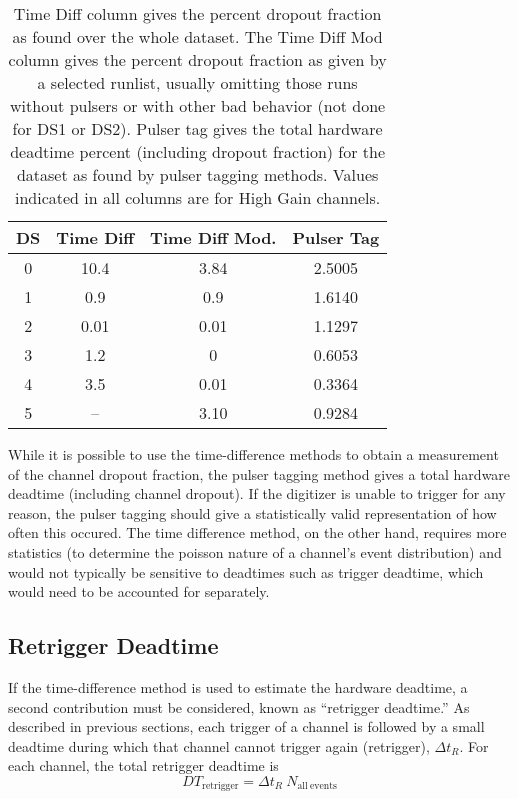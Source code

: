 \documentclass[notitlepage,rmp,aps,10pt]{revtex4-1}
\begin{document}
\begin{table}[ht]
\centering
\begin{tabular}{|c|c|c|c|}
    \hline
    DS  &Time Diff& Time Diff Mod. &  Pulser Tag \\
    \hline
    0   & 10.4  & 3.84      & 2.5005 \\
    1   & 0.9   & 0.9       & 1.6140 \\
    2   & 0.01  & 0.01      & 1.1297 \\
    3   & 1.2   & 0         & 0.6053 \\
    4   & 3.5   & 0.01      & 0.3364 \\
    5   & --    & 3.10      & 0.9284 \\
    \hline
\end{tabular}
\caption{Time Diff column gives the percent dropout fraction as found over the whole dataset. The Time Diff Mod column gives the percent dropout fraction as given by a selected runlist, usually omitting those runs without pulsers or with other bad behavior (not done for DS1 or DS2). Pulser tag gives the total hardware deadtime percent (including dropout fraction) for the dataset as found by pulser tagging methods. Values indicated in all columns are for High Gain channels. }
\label{tab:dtcomparison}
\end{table}

While it is possible to use the time-difference methods to obtain a measurement of the channel dropout fraction, the pulser tagging method gives a total hardware deadtime (including channel dropout).
If the digitizer is unable to trigger for any reason, the pulser tagging should give a statistically valid representation of how often this occured.
The time difference method, on the other hand, requires more statistics (to determine the poisson nature of a channel's event distribution) and would not typically be sensitive to deadtimes such as trigger deadtime, which would need to be accounted for separately.


\subsection{Retrigger Deadtime} \label{sec:retrigger}

If the time-difference method is used to estimate the hardware deadtime, a second contribution must be considered, known as ``retrigger deadtime.''   As described in previous sections, each trigger of a channel is followed by a small deadtime during which that channel cannot trigger again (retrigger), $\Delta t_R$.  For each channel, the total retrigger deadtime is
\begin{equation}
  DT_{\mathrm{retrigger}} = \Delta t_R\ N_{\mathrm{all\ events}}
\end{equation}
\end{document}

